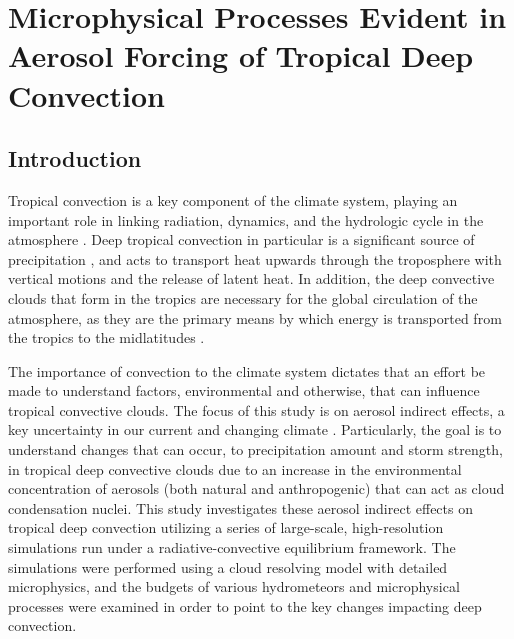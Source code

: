 \section{Microphysical Processes Evident in Aerosol Forcing of Tropical Deep Convection}

\subsection{Introduction}
Tropical convection is a key component of the climate system, playing an important role in linking radiation, dynamics, and the hydrologic cycle in the atmosphere \citep{Arakawa:2004p1884}.  Deep tropical convection in particular is a significant source of precipitation \citep{Haynes:2007p3667,liuprecip}, and acts to transport heat upwards through the troposphere with vertical motions and the release of latent heat. In addition, the deep convective clouds that form in the tropics are necessary for the global circulation of the atmosphere, as they are the primary means by which energy is transported from the tropics to the midlatitudes \citep{Riehl:1958,Fierro:2009p2,Fierro:2012p8580}.  

The importance of convection to the climate system dictates that an effort be made to understand factors, environmental and otherwise, that can influence tropical convective clouds.  The focus of this study is on aerosol indirect effects, a key uncertainty in our current and changing climate \citep{Solomon:2007p14}.  Particularly, the goal is to understand changes that can occur, to precipitation amount and storm strength, in tropical deep convective clouds due to an increase in the environmental concentration of aerosols (both natural and anthropogenic) that can act as cloud condensation nuclei.  This study investigates these aerosol indirect effects on tropical deep convection utilizing a series of large-scale, high-resolution simulations run under a radiative-convective equilibrium framework.  The simulations were performed using a cloud resolving model with detailed microphysics, and the budgets of various hydrometeors and microphysical processes were examined in order to point to the key changes impacting deep convection.

